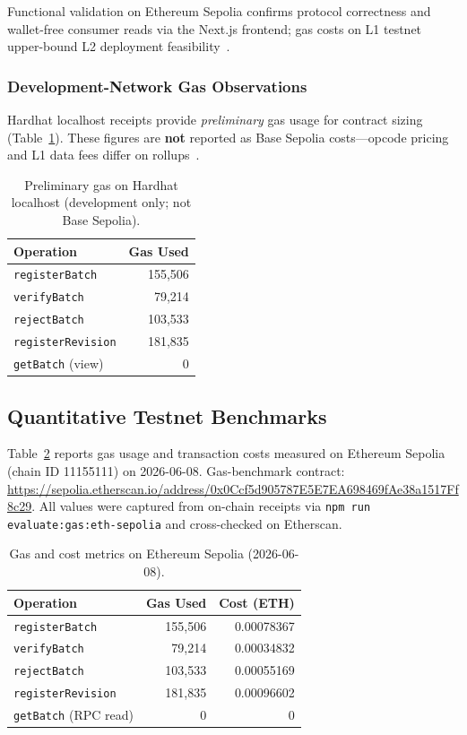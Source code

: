 Functional validation on Ethereum Sepolia confirms protocol correctness and wallet-free consumer reads via the Next.js frontend; gas costs on L1 testnet upper-bound L2 deployment feasibility~\cite{optimism2024spec}.


\subsubsection{Development-Network Gas Observations}
Hardhat localhost receipts provide \emph{preliminary} gas usage for contract sizing (Table~\ref{tab:gas-local}).
These figures are \textbf{not} reported as Base Sepolia costs---opcode pricing and L1 data fees differ on rollups~\cite{optimism2024spec}.

\begin{table}[t]
  \caption{Preliminary gas on Hardhat localhost (development only; not Base Sepolia).}
  \label{tab:gas-local}
  \centering
  \footnotesize
  \begin{tabularx}{\columnwidth}{@{}Xr@{}}
    \toprule
    \textbf{Operation} & \textbf{Gas Used} \\
    \midrule
    \texttt{registerBatch} & 155{,}506 \\
    \texttt{verifyBatch} & 79{,}214 \\
    \texttt{rejectBatch} & 103{,}533 \\
    \texttt{registerRevision} & 181{,}835 \\
    \texttt{getBatch} (view) & 0 \\
    \bottomrule
  \end{tabularx}
\end{table}

\subsection{Quantitative Testnet Benchmarks}
\label{sec:eval-b}

Table~\ref{tab:gas} reports gas usage and transaction costs measured on Ethereum Sepolia (chain ID 11155111) on 2026-06-08.
Gas-benchmark contract: \url{https://sepolia.etherscan.io/address/0x0Ccf5d905787E5E7EA698469fAe38a1517Ff8c29}.
All values were captured from on-chain receipts via \texttt{npm run evaluate:gas:eth-sepolia} and cross-checked on Etherscan.

\begin{table}[t]
  \caption{Gas and cost metrics on Ethereum Sepolia (2026-06-08).}
  \label{tab:gas}
  \centering
  \footnotesize
  \begin{tabularx}{\columnwidth}{@{}Xrr@{}}
    \toprule
    \textbf{Operation} & \textbf{Gas Used} & \textbf{Cost (ETH)} \\
    \midrule
    \texttt{registerBatch} & 155,506 & 0.00078367 \\
    \texttt{verifyBatch} & 79,214 & 0.00034832 \\
    \texttt{rejectBatch} & 103,533 & 0.00055169 \\
    \texttt{registerRevision} & 181,835 & 0.00096602 \\
    \texttt{getBatch} (RPC read) & 0 & 0 \\
    \bottomrule
  \end{tabularx}
\end{table}

